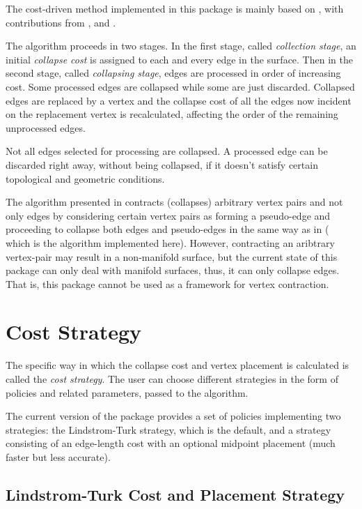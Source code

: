 The cost-driven method implemented in this package is mainly based on \cite{cgal:lt-fmeps-98,cgal:lt-ems-99}, with contributions from \cite{hddms-mo-93}, \cite{gh-ssqem-97}
and \cite{degn-tpec-98}.

The algorithm proceeds in two stages. In the first stage, called {\em collection stage}, 
an initial {\em collapse cost} is assigned to each and every edge in the surface.
Then in the second stage, called {\em collapsing stage}, edges are 
processed in order of increasing cost. Some processed edges are collapsed 
while some are just discarded. Collapsed edges are replaced by a vertex and the collapse 
cost of all the edges now incident on the replacement vertex is recalculated, affecting 
the order of the remaining unprocessed edges.

Not all edges selected for processing are collapsed. A processed edge can be discarded 
right away, without being collapsed, if it doesn't satisfy certain topological
and geometric conditions.

The algorithm presented in \cite{gh-ssqem-97} contracts (collapses) arbitrary vertex pairs and not 
only edges by considering certain vertex pairs as forming a pseudo-edge and proceeding to collapse
both edges and pseudo-edges in the same way as in \cite{cgal:lt-fmeps-98,cgal:lt-ems-99} ( 
which is the algorithm implemented here). However, contracting an aribtrary vertex-pair may result in a non-manifold surface, but the current state of this package can only deal with manifold surfaces, thus, it can only collapse edges. That is, this package cannot be used as a framework for vertex contraction.

\section{Cost Strategy}

The specific way in which the collapse cost and vertex placement is
calculated is called the {\em cost strategy}. The user can choose 
different strategies in the form of policies and related parameters,
passed to the algorithm.
 
The current version of the package provides a set of policies implementing
two strategies: the Lindstrom-Turk strategy, which is the default, and 
a strategy consisting of an edge-length cost with an optional
midpoint placement (much faster but less accurate).

\subsection{Lindstrom-Turk Cost and Placement Strategy\label{SurfaceMeshSimplification:LindstromTurkStrategy}}

